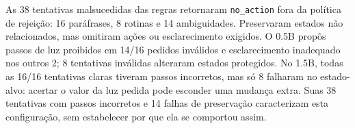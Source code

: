 As 38 tentativas malsucedidas das regras retornaram \texttt{no\_action} fora da política de rejeição: 16 paráfrases, 8 rotinas e 14 ambiguidades. Preservaram estados não relacionados, mas omitiram ações ou esclarecimento exigidos. O 0.5B propôs passos de luz proibidos em 14/16 pedidos inválidos e esclarecimento inadequado nos outros 2; 8 tentativas inválidas alteraram estados protegidos. No 1.5B, todas as 16/16 tentativas claras tiveram passos incorretos, mas só 8 falharam no estado-alvo: acertar o valor da luz pedida pode esconder uma mudança extra. Suas 38 tentativas com passos incorretos e 14 falhas de preservação caracterizam esta configuração, sem estabelecer por que ela se comportou assim.

